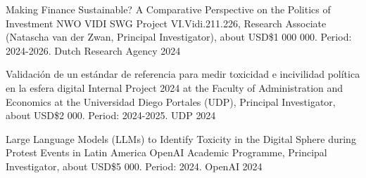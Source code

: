 





\vspace{1mm}

\begin{cvhonors}
\cvhonor
{Making Finance Sustainable? A Comparative Perspective on the Politics of Investment}
{NWO VIDI SWG Project VI.Vidi.211.226, Research Associate (Natascha van der Zwan, Principal Investigator), about USD\$1 000 000. Period: 2024-2026.} %
{Dutch Research Agency}
{2024}
\end{cvhonors}

\vspace{1mm}

\begin{cvhonors}
\cvhonor
{Validación de un estándar de referencia para medir toxicidad e incivilidad política en la esfera digital}
{Internal Project 2024 at the Faculty of Administration and Economics at the Universidad Diego Portales (UDP), Principal Investigator, about USD\$2 000. Period: 2024-2025.} %
{UDP}
{2024}
\end{cvhonors}

\vspace{1mm}

\begin{cvhonors}
\cvhonor
{Large Language Models (LLMs) to Identify Toxicity in the Digital Sphere during Protest Events in Latin America}
{OpenAI Academic Programme, Principal Investigator, about USD\$5 000. Period: 2024.}
{OpenAI}
{2024}
\end{cvhonors}

\vspace{1mm}

